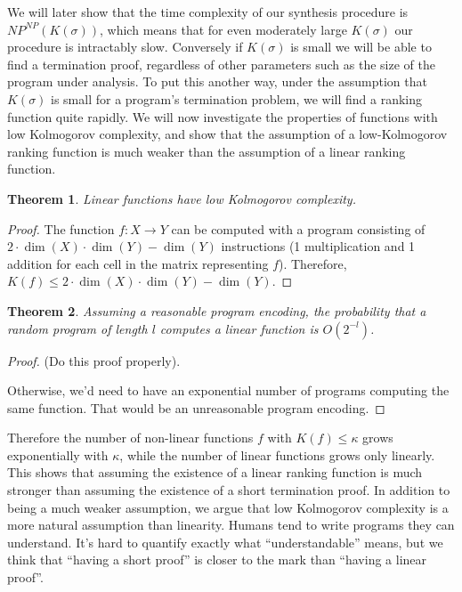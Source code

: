 \documentclass[preprint]{sigplanconf}
\newtheorem{theorem}{Theorem}
\theoremstyle{definition}
\begin{document}
We will later show that the time complexity of our synthesis procedure is $NP^{NP}(K(\sigma))$,
which means that for even moderately large $K(\sigma)$ our procedure is intractably slow.  Conversely
if $K(\sigma)$ is small we will be able to find a termination proof, regardless of other parameters
such as the size of the program under analysis.  To put this another way, under the assumption
that $K(\sigma)$ is small for a program's termination problem, we will find a ranking function
quite rapidly.  We will now investigate the properties of functions with low Kolmogorov complexity,
and show that the assumption of a low-Kolmogorov ranking function is much weaker than the assumption
of a linear ranking function.


\begin{theorem}
 Linear functions have low Kolmogorov complexity.
\end{theorem}

\begin{proof}
 The function $f: X \to Y$ can be computed with a program consisting of
 $2 \cdot \dim(X) \cdot \dim(Y) - \dim(Y)$ instructions (1 multiplication and 1 addition for
 each cell in the matrix representing $f$).  Therefore,
 $K(f) \leq 2 \cdot \dim(X) \cdot \dim(Y) - \dim(Y)$.
\end{proof}

\begin{theorem}
Assuming a reasonable program encoding, the probability that a random program of length $l$ computes
a linear function is $O(2^{-l})$.
\end{theorem}

\begin{proof}
 (Do this proof properly).
 
 Otherwise, we'd need to have an exponential number of programs computing the same function.
 That would be an unreasonable program encoding.
\end{proof}


Therefore the number of non-linear functions $f$ with $K(f) \leq \kappa$
grows exponentially with $\kappa$, while the number of linear functions
grows only linearly.  This shows that assuming the existence of a linear
ranking function is much stronger than assuming the existence of a short
termination proof.  In addition to being a much weaker assumption,
we argue that low Kolmogorov complexity is a more natural assumption than
linearity.  Humans tend to write programs they can understand.  It's hard
to quantify exactly what ``understandable'' means, but we think that
``having a short proof'' is closer to the mark than ``having a linear proof''.
\end{document}
